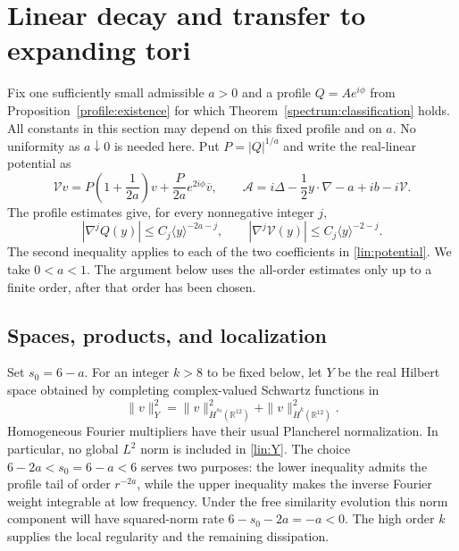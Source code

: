 \documentclass[11pt]{article}
\numberwithin{equation}{section}
\theoremstyle{definition}
\theoremstyle{remark}
\begin{document}
\section{Linear decay and transfer to expanding tori}\label{sec:linear}

Fix one sufficiently small admissible $a>0$ and a profile $Q=Ae^{i\phi}$
from Proposition~\ref{profile:existence} for which
Theorem~\ref{spectrum:classification} holds.  All constants in this section
may depend on this fixed profile and on $a$.  No uniformity as $a\downarrow0$
is needed here.  Put $P=|Q|^{1/a}$ and write the real-linear potential as
\begin{equation}\label{lin:potential}
 \mathcal Vv=P\left(1+\frac1{2a}\right)v
       +\frac{P}{2a}e^{2i\phi}\overline v,
 \qquad
 \mathcal A=i\Delta-\frac12y\cdot\nabla-a+ib-i\mathcal V.
\end{equation}
The profile estimates give, for every nonnegative integer $j$,
\begin{equation}\label{lin:symbol-hypotheses}
 |\nabla^j Q(y)|\le C_j\langle y\rangle^{-2a-j},\qquad
 |\nabla^j\mathcal V(y)|\le C_j\langle y\rangle^{-2-j}.
\end{equation}
The second inequality applies to each of the two coefficients in
\eqref{lin:potential}.  We take $0<a<1$.  The argument below uses the
all-order estimates only up to a finite order, after that order has been
chosen.

\subsection{Spaces, products, and localization}

Set $s_0=6-a$.  For an integer $k>8$ to be fixed below, let $Y$ be the real
Hilbert space obtained by completing complex-valued Schwartz functions in
\begin{equation}\label{lin:Y}
 \|v\|_Y^2=\|v\|_{\dot H^{s_0}(\mathbb R^{12})}^2
                      +\|v\|_{\dot H^k(\mathbb R^{12})}^2.
\end{equation}
Homogeneous Fourier multipliers have their usual Plancherel normalization.
In particular, no global $L^2$ norm is included in \eqref{lin:Y}.
The choice $6-2a<s_0=6-a<6$ serves two purposes: the lower inequality
admits the profile tail of order $r^{-2a}$, while the upper inequality
makes the inverse Fourier weight integrable at low frequency. Under the
free similarity evolution this norm component will have squared-norm
rate $6-s_0-2a=-a<0$. The high order $k$ supplies the local regularity
and the remaining dissipation.
\end{document}
